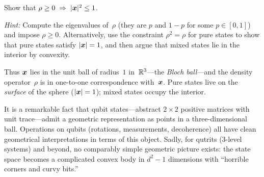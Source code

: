 \begin{exercise}\label{ex:bloch-ball}
  Show that $\rho \geq 0 \;\Rightarrow\; \lvert\boldsymbol{x}\rvert^2 \leq 1$.

  \emph{Hint:} Compute the eigenvalues of~$\rho$ (they are $p$ and
  $1-p$ for some $p \in [0,1]$) and impose $\rho \geq 0$.
  Alternatively, use the constraint $\rho^2 = \rho$ for pure states to
  show that pure states satisfy $\lvert\boldsymbol{x}\rvert = 1$, and then
  argue that mixed states lie in the interior by convexity.
\end{exercise}

Thus $\boldsymbol{x}$ lies in the unit ball of radius~$1$ in~$\mathbb{R}^3$---the
\emph{Bloch ball}---and the density operator~$\rho$ is in one-to-one
correspondence with~$\boldsymbol{x}$.  Pure states live on the
\emph{surface} of the sphere ($\lvert\boldsymbol{x}\rvert = 1$); mixed states
occupy the interior.

\begin{center}
\end{center}

\begin{intuition}
  It is a remarkable fact that qubit states---abstract $2\times 2$
  positive matrices with unit trace---admit a geometric representation
  as points in a three-dimensional ball.  Operations on qubits
  (rotations, measurements, decoherence) all have clean geometrical
  interpretations in terms of this object.  Sadly, for qutrits ($3$-level
  systems) and beyond, no comparably simple geometric picture exists:
  the state space becomes a complicated convex body in $d^2-1$
  dimensions with ``horrible corners and curvy bits.''
\end{intuition}

